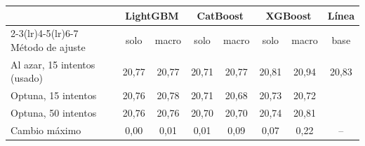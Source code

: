 \begin{tabular}{l cc cc cc c}
\toprule
 & \multicolumn{2}{c}{LightGBM} & \multicolumn{2}{c}{CatBoost} & \multicolumn{2}{c}{XGBoost} & Línea \\
\cmidrule(lr){2-3}\cmidrule(lr){4-5}\cmidrule(lr){6-7}
Método de ajuste & solo & macro & solo & macro & solo & macro & base \\
\midrule
Al azar, 15 intentos (usado) & 20,77 & 20,77 & 20,71 & 20,77 & 20,81 & 20,94 & 20,83 \\
Optuna, 15 intentos & 20,76 & 20,78 & 20,71 & 20,68 & 20,73 & 20,72 &  \\
Optuna, 50 intentos & 20,76 & 20,76 & 20,70 & 20,70 & 20,74 & 20,81 &  \\
\midrule
Cambio máximo & 0,00 & 0,01 & 0,01 & 0,09 & 0,07 & 0,22 & -- \\
\bottomrule
\end{tabular}
